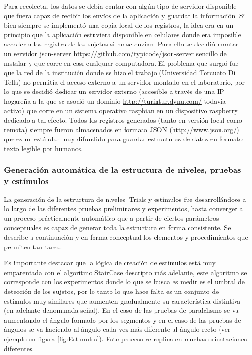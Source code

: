 \documentclass{article}
\numberwithin{figure}{section}
\begin{document}
    Para recolectar los datos se debía contar con algún tipo de servidor disponible que fuera capaz de recibir los envíos de la aplicación y guardar la información. Si bien siempre se implementó una copia local de los registros, la idea era en un principio que la aplicación estuviera disponible en celulares donde era imposible acceder a los registro de los sujetos si no se envían. Para ello se decidió montar un servidor json-server \url{https://github.com/typicode/json-server} sencillo de instalar y que corre en casi cualquier computadora. El problema que surgió fue que la red de la institución donde se hizo el trabajo (Universidad Torcuato Di Tella) no permitía el acceso externo a un servidor montado en el laboratorio, por lo que se decidió dedicar un servidor externo (accesible a través de una IP hogareña a la que se asoció un dominio \url{http://turintur.dynu.com/} todavía activo) que corre en un sistema operativo raspbian en un dispositivo raspberry dedicado a tal efecto. Todos los registros generados (tanto en versión local como remota) siempre fueron almacenados en formato JSON (\url{http://www.json.org/}) que es un estándar muy difundido para guardar estructuras de datos en formato texto legible por humanos. 
    
    \subsubsection{Generación automática de la estructura de niveles, pruebas y estímulos} \label{seccion:builder}
    
    La generación de la estructura de niveles, Trials y estímulos fue desarrollándose a lo largo de las diferentes pruebas preliminares y experimentos, hasta converger a un proceso prácticamente automático que a partir de ciertos parámetros conceptuales es capaz de generar toda la estructura en forma consistente. Se describe a continuación y en forma conceptual los elementos y procedimientos que permiten tan tarea. 
    
    Es importante destacar que la lógica de creación de estímulos está muy emparentada con el algoritmo StairCase descripto más adelante, este algoritmo se corresponde con los experimentos donde lo que se busca es medir es el umbral de detección de los sujetos, por lo tanto lo que hace falta es un conjunto de estímulos muy similares que aumenten gradualmente su característica distintiva (en adelante denominada señal). En el caso de las pruebas de paralelismo se va aumentando el ángulo formado por los segmentos y en el caso de las pruebas de ángulos se va haciendo al ángulo cada vez más diferente al ángulo recto (ver ejemplo en figura \ref{fig:Estimulos}). Este proceso re replica en muchas orientaciones diferentes.
    
\end{document}
